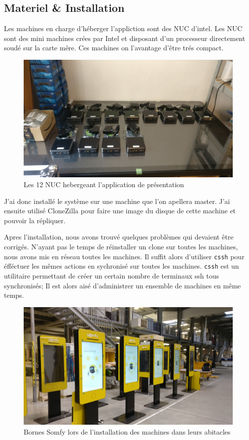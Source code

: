 \subsection{Materiel \& Installation}

Les machines en charge d'héberger l'appliction sont des NUC d'intel.
Les NUC sont des mini machines crées par Intel et disposant d'un processeur directement soudé sur la carte mêre.
Ces machines on l'avantage d'être trés compact.

\begin{figure}[h]
    \centering
    \includegraphics[scale=0.1]{img/somfy-nuc.jpg}
    \caption{Les 12 NUC hebergeant l'application de présentation}
\end{figure}

J'ai donc installé le système sur une machine que l'on apellera master.
J'ai ensuite utilisé CloneZilla pour faire une image du disque de cette machine et pouvoir la répliquer.

Apres l'installation, nous avons trouvé quelques problèmes qui devaient être corrigés.
N'ayant pas le temps de réinstaller un clone sur toutes les machines, nous avons mis en réseau toutes les machines.
Il suffit alors d'utiliser \texttt{cssh} pour éfféctuer les mêmes actions en sychronisé sur toutes les machines.
\texttt{cssh} est un utilitaire permettant de créer un certain nombre de terminaux ssh tous synchronisés;
Il est alors aisé d'administrer un ensemble de machines en même temps.

\begin{figure}[h]
    \centering
    \includegraphics[scale=0.1]{img/somfy-install.jpg}
    \caption{Bornes Somfy lors de l'installation des machines dans leurs abitacles}
\end{figure}


